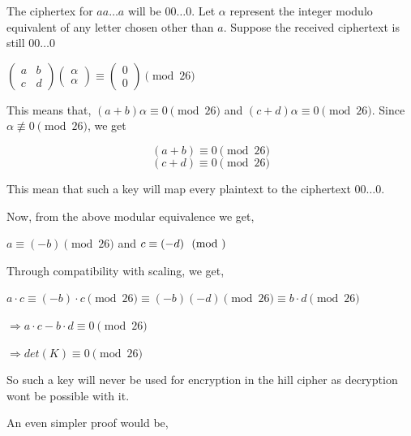 \documentclass{ashoka-crypto}
\begin{document}
\begin{enumerate}[label=(\alph*)]
The ciphertex for $aa\dots a$ will be $00\dots 0$. Let $\alpha$ represent the integer modulo equivalent of any letter chosen other than $a$. Suppose the received ciphertext is still $00\dots 0$

\begin{center}
\begin{math}
\begin{pmatrix}
a & b \\
c & d
\end{pmatrix}
\begin{pmatrix}
\alpha \\
\alpha
\end{pmatrix}
\equiv 
\begin{pmatrix}
0\\
0
\end{pmatrix}
\pmod{26}
\end{math}
\end{center}

This means that, $(a + b)\alpha \equiv 0 \pmod{26}$ and $(c + d)\alpha \equiv 0 \pmod {26}$. Since $\alpha \not\equiv 0 \pmod {26}$, we get 

\begin{equation}
(a + b) \equiv 0 \pmod{26}
\end{equation}
\begin{equation}
(c + d) \equiv 0 \pmod{26}
\end{equation}

This mean that such a key will map every plaintext to the ciphertext $00\dots 0$.

Now, from the above modular equivalence we get,

\begin{center}
$a \equiv (-b) \pmod {26}$ and $c \equiv (-d) \pmod$
\end{center}

Through compatibility with scaling, we get,

\begin{center}
$a\cdot c \equiv (-b)\cdot c \pmod{26} \equiv (-b)(-d) \pmod 26 \equiv b\cdot d \pmod {26}$

$\Rightarrow a\cdot c - b \cdot d \equiv 0 \pmod {26}$

$\Rightarrow det(K) \equiv 0 \pmod {26}$
\end{center}

So such a key will never be used for encryption in the hill cipher as decryption wont be possible with it.

An even simpler proof would be,


\end{enumerate}
\end{document}
